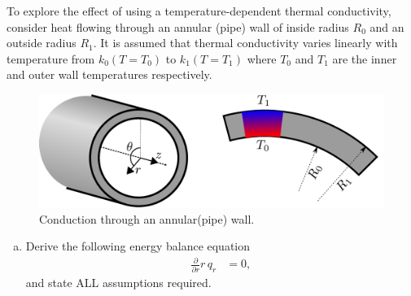 \documentclass[calculator,datasheet,handbook]{exam}
\begin{document}
\begin{question}
  To explore the effect of using a temperature-dependent thermal
  conductivity, consider heat flowing through an annular (pipe) wall
  of inside radius $R_{0}$ and an outside radius $R_{1}$. It is
  assumed that thermal conductivity varies linearly with temperature
  from $k_{0}(T=T_{0})$ to $k_{1}(T=T_{1})$ where $T_{0}$ and $T_{1}$
  are the inner and outer wall temperatures respectively.
  \begin{figure}[ht]%
    \begin{center}%
      \includegraphics[width=0.8\linewidth,clip]{figures/cyl_cond}%
    \end{center}
    \caption{\label{fig:cylindrical_cond} Conduction through an annular(pipe) wall.}
  \end{figure}
  \begin{enumerate}[a)]
  \item Derive the following energy balance equation
    \begin{align*}
      \frac{\partial}{\partial r} r\, q_r &= 0,
    \end{align*}
    and state ALL assumptions required.
\end{enumerate}
\end{question}
\end{document}
